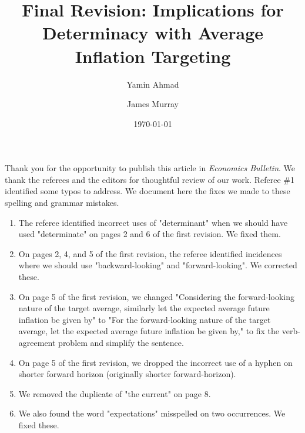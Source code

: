 \documentclass[english,authoryear,12pt]{elsarticle}
\def\baselinestretch{1}%
\def\baselinestretch{1}%
\gdef\thefootnote{\arabic{footnote}}%
\begin{document}
	\begin{frontmatter}
		\title{Final Revision: Implications for Determinacy with Average Inflation Targeting}
		\date{\today}
		\author[1]{Yamin Ahmad}
		\author[2]{James Murray}

		\address[1]{Dept. of Economics, University of Wisconsin - Whitewater, 809 W. Starin Road, Whitewater, WI 53190, USA}
		\address[2]{Dept. of Economics, University of Wisconsin - La Crosse, 1725 State St., La Crosse, WI 54601, USA}

\end{frontmatter}

\renewcommand{\thefootnote}{\arabic{footnote}}%
\setcounter{page}{1}%
\setcounter{footnote}{0}%

Thank you for the opportunity to publish this article in \textit{Economics Bulletin}. We thank the referees and the editors for thoughtful review of our work. Referee \#1 identified some typos to address. We document here the fixes we made to these spelling and grammar mistakes.

\begin{enumerate}
    \item The referee identified incorrect uses of "determinant" when we should have used "determinate" on pages 2 and 6 of the first revision. We fixed them.
    \item On pages 2, 4, and 5 of the first revision, the referee identified incidences where we should use "backward-looking" and "forward-looking". We corrected these.
    \item On page 5 of the first revision, we changed "Considering the forward-looking nature of the target average, similarly let the expected average future inflation be given by" to "For the forward-looking nature of the target average, let the expected average future inflation be given by," to fix the verb-agreement problem and simplify the sentence.
    \item On page 5 of the first revision, we dropped the incorrect use of a hyphen on shorter forward horizon (originally shorter forward-horizon).
    \item We removed the duplicate of "the current" on page 8.
    \item We also found the word "expectations" misspelled on two occurrences. We fixed these.
\end{enumerate}
\end{document}
